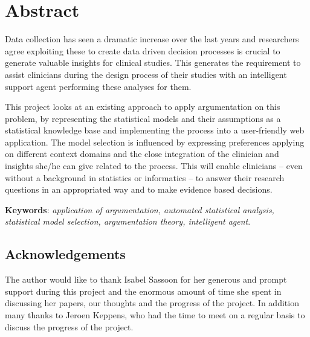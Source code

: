 \section*{Abstract}

Data collection has seen a dramatic increase over the last years and researchers agree exploiting these to create data driven decision processes is crucial to generate valuable insights for clinical studies. This generates the requirement to assist clinicians during the design process of their studies with an intelligent support agent performing these analyses for them. 

This project looks at an existing approach to apply argumentation on this problem, by representing the statistical models and their assumptions as a statistical knowledge base and implementing the process into a user-friendly web application. The model selection is influenced by expressing preferences applying on different context domains and the close integration of the clinician and insights she/he can give related to the process. This will enable clinicians -- even without a background in statistics or informatics -- to answer their research questions in an appropriated way and to make evidence based decisions. 

\bigskip
\bigskip

\textbf{Keywords}: \textit{application of argumentation, automated statistical analysis, statistical model selection, argumentation theory, intelligent agent}.

\bigskip
\bigskip

\subsection*{Acknowledgements}
The author would like to thank Isabel Sassoon for her generous and prompt support during this project and the enormous amount of time she spent in discussing her papers, our thoughts and the progress of the project. In addition many thanks to Jeroen Keppens, who had the time to meet on a regular basis to discuss the progress of the project.
